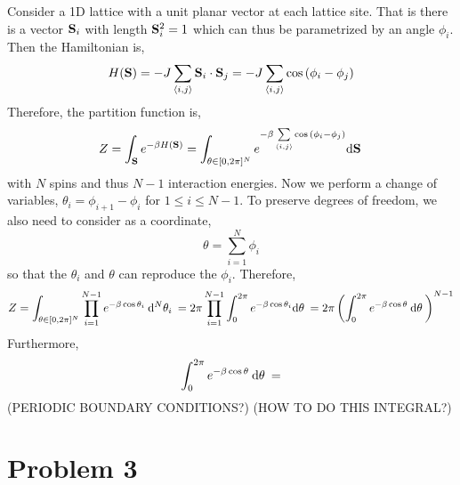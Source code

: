 \documentclass[12pt]{extarticle}
\begin{document}
Consider a 1D lattice with a unit planar vector at each lattice site. That is there is a vector $\bf{S}_i$ with length $\bf{S}_i^2 = 1$ which can thus be parametrized by an angle $\phi_i$. Then the Hamiltonian is,
\[ H(\bf{S}) = - J \sum_{\left< i, j \right>} \bf{S}_i \cdot \bf{S}_j = - J \sum_{\left< i, j \right>} \cos{(\phi_i - \phi_j)} \]
Therefore, the partition function is,
\[ Z = \int_{\bf{S}} e^{-\beta H(\bf{S})} = \int_{\theta \in [0 , 2 \pi]^N} e^{-\beta \sum\limits_{\left< i, j \right>} \cos{(\phi_i - \phi_j)}} \d{\bf{S}} \]
with $N$ spins and thus $N - 1$ interaction energies.
Now we perform a change of variables, $\theta_i = \phi_{i + 1} - \phi_i$ for $1 \le i \le N-1$. To preserve degrees of freedom, we also need to consider as a coordinate,
\[ \theta = \sum_{i = 1}^N \phi_i \]
so that the $\theta_i$ and $\theta$ can reproduce the $\phi_i$. 
Therefore,
\begin{align*}
Z = \int_{\theta \in [0, 2 \pi]^N} \prod_{i = 1}^{N-1} e^{-\beta \cos{\theta_i}} \: \dn{N}{\theta_i} = 2 \pi \prod_{i = 1}^{N-1} \int_{0}^{2 \pi} e^{-\beta \cos{\theta_i}} \d{\theta} = 2 \pi \left( \int_0^{2 \pi} e^{-\beta \cos{\theta}} \: \d{\theta} \right)^{N-1}
\end{align*}
Furthermore, 
\[ \int_0^{2 \pi} e^{-\beta \cos{\theta}} \: \d{\theta} =  \]
(PERIODIC BOUNDARY CONDITIONS?)
(HOW TO DO THIS INTEGRAL?)

\section{Problem 3}
\end{document}
